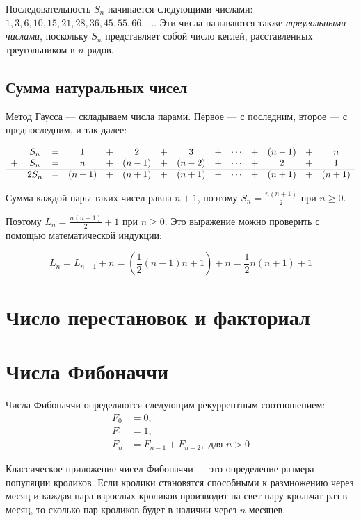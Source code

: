 \documentclass[14pt]{book}
\begin{document}
Последовательность $S_n$ начинается следующими числами: $1, 3, 6, 10, 15, 21, 28, 36, 45, 55, 66, \ldots$.
Эти числа называются также \emph{треугольными числами}, поскольку $S_n$ представляет собой
число кеглей, расставленных треугольником в $n$ рядов.

\subsection{Сумма натуральных чисел}

Метод Гаусса --- складываем числа парами. Первое --- с последним, второе --- с предпоследним,
и так далее:

\begin{equation}
\begin{array}{cccccccccccccc}
  & S_n & = & 1 & + & 2 & + & 3 & + & \cdots & + & (n-1) & + & n \\
+ & S_n & = & n & + & (n-1) & + & (n-2) & + & \cdots & + & 2 & + & 1 \\
\hline
  & 2S_n & = & (n+1) & + & (n+1) & + & (n+1) & + & \cdots & + & (n+1) & + & (n+1)
\end{array}
\end{equation}

Сумма каждой пары таких чисел равна $n+1$, поэтому $S_n = \frac{n(n+1)}{2}$ при $n \ge 0$.

Поэтому $L_n = \frac{n(n+1)}{2} + 1$ при $n \ge 0$.
Это выражение можно проверить с помощью математической индукции:

$$
L_n = L_{n-1} + n = \left(\frac{1}{2}(n-1)n+1 \right)+n = \frac{1}{2}n(n+1) + 1
$$

\section{Число перестановок и факториал}
\section{Числа Фибоначчи}

Числа Фибоначчи определяются следующим рекуррентным соотношением:
\begin{align*}
F_0 &= 0, \\
F_1 &= 1, \\
F_n &= F_{n-1} + F_{n-2}, \text{ для $n>0$}
\end{align*}

Классическое приложение чисел Фибоначчи --- это определение размера популяции кроликов.
Если кролики становятся способными к размножению через месяц и каждая пара взрослых кроликов
производит на свет пару крольчат раз в месяц, то сколько пар кроликов будет в наличии
через $n$ месяцев.
\end{document}
